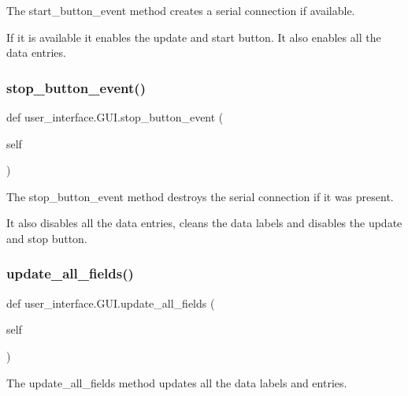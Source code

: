 The start\+\_\+button\+\_\+event method creates a serial connection if available. 

If it is available it enables the update and start button. It also enables all the data entries. \mbox{\label{classuser__interface_1_1GUI_a6cafdec7e2cc0ca9a25429bdc44fd96e}} 
\subsubsection{\texorpdfstring{stop\+\_\+button\+\_\+event()}{stop\_button\_event()}}
{\footnotesize\ttfamily def user\+\_\+interface.\+G\+U\+I.\+stop\+\_\+button\+\_\+event (\begin{DoxyParamCaption}\item[{}]{self }\end{DoxyParamCaption})}



The stop\+\_\+button\+\_\+event method destroys the serial connection if it was present. 

It also disables all the data entries, cleans the data labels and disables the update and stop button. \mbox{\label{classuser__interface_1_1GUI_a944eaec52425551da4af2534fb43d721}} 
\subsubsection{\texorpdfstring{update\+\_\+all\+\_\+fields()}{update\_all\_fields()}}
{\footnotesize\ttfamily def user\+\_\+interface.\+G\+U\+I.\+update\+\_\+all\+\_\+fields (\begin{DoxyParamCaption}\item[{}]{self }\end{DoxyParamCaption})}



The update\+\_\+all\+\_\+fields method updates all the data labels and entries. 

